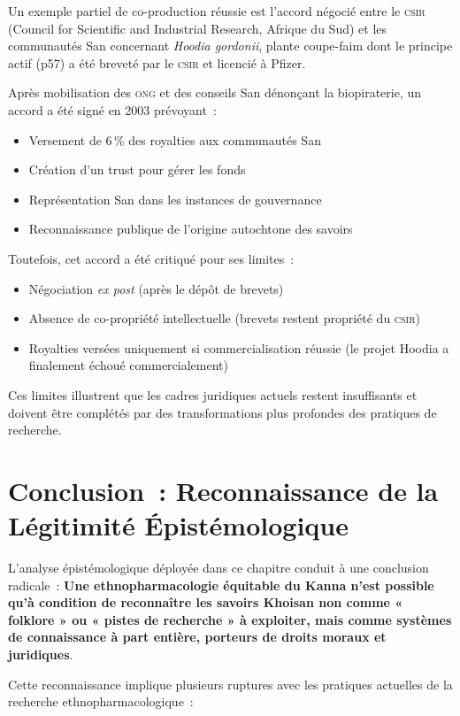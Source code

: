 \documentclass[12pt,a4paper,twoside]{book}
\begin{document}
Un exemple partiel de co-production réussie est l'accord négocié entre le \textsc{csir} (Council for Scientific and Industrial Research, Afrique du Sud) et les communautés San concernant \textit{Hoodia gordonii}, plante coupe-faim dont le principe actif (p57) a été breveté par le \textsc{csir} et licencié à Pfizer.

Après mobilisation des \textsc{ong} et des conseils San dénonçant la biopiraterie, un accord a été signé en 2003 prévoyant~:
\begin{itemize}
\item Versement de 6\,\% des royalties aux communautés San
\item Création d'un trust pour gérer les fonds
\item Représentation San dans les instances de gouvernance
\item Reconnaissance publique de l'origine autochtone des savoirs
\end{itemize}

Toutefois, cet accord a été critiqué pour ses limites~:
\begin{itemize}
\item Négociation \textit{ex post} (après le dépôt de brevets)
\item Absence de co-propriété intellectuelle (brevets restent propriété du \textsc{csir})
\item Royalties versées uniquement si commercialisation réussie (le projet Hoodia a finalement échoué commercialement)
\end{itemize}

Ces limites illustrent que les cadres juridiques actuels restent insuffisants et doivent être complétés par des transformations plus profondes des pratiques de recherche.

\section{Conclusion~: Reconnaissance de la Légitimité Épistémologique}

L'analyse épistémologique déployée dans ce chapitre conduit à une conclusion radicale~: \textbf{Une ethnopharmacologie équitable du Kanna n'est possible qu'à condition de reconnaître les savoirs Khoisan non comme « folklore » ou « pistes de recherche » à exploiter, mais comme systèmes de connaissance à part entière, porteurs de droits moraux et juridiques}.

Cette reconnaissance implique plusieurs ruptures avec les pratiques actuelles de la recherche ethnopharmacologique~:
\end{document}
